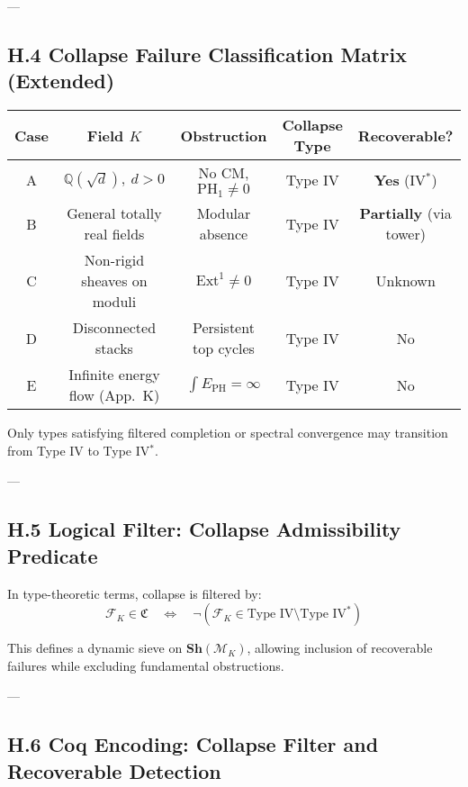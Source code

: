 \documentclass[11pt]{article}
\begin{document}
---

\subsection*{H.4 Collapse Failure Classification Matrix (Extended)}

\begin{center}
\renewcommand{\arraystretch}{1.3}
\begin{tabular}{|c|c|c|c|c|}
\hline
\textbf{Case} & \textbf{Field \( K \)} & \textbf{Obstruction} & \textbf{Collapse Type} & \textbf{Recoverable?} \\
\hline
A & \( \mathbb{Q}(\sqrt{d}),\ d > 0 \) & No CM, \( \mathrm{PH}_1 \ne 0 \) & Type IV & \textbf{Yes} (IV$^\ast$) \\
B & General totally real fields & Modular absence & Type IV & \textbf{Partially} (via tower) \\
C & Non-rigid sheaves on moduli & \( \mathrm{Ext}^1 \ne 0 \) & Type IV & Unknown \\
D & Disconnected stacks & Persistent top cycles & Type IV & No \\
E & Infinite energy flow (App.~K) & \( \int E_{\mathrm{PH}} = \infty \) & Type IV & No \\
\hline
\end{tabular}
\end{center}

Only types satisfying filtered completion or spectral convergence may transition from Type IV to Type IV$^{\ast}$.

---

\subsection*{H.5 Logical Filter: Collapse Admissibility Predicate}

In type-theoretic terms, collapse is filtered by:
\[
\mathcal{F}_K \in \mathfrak{C} \quad \Leftrightarrow \quad \neg (\mathcal{F}_K \in \text{Type IV} \setminus \text{Type IV}^{\ast})
\]

This defines a dynamic sieve on \( \mathbf{Sh}(\mathcal{M}_K) \), allowing inclusion of recoverable failures while excluding fundamental obstructions.

---

\subsection*{H.6 Coq Encoding: Collapse Filter and Recoverable Detection}
\label{subsec:coq-typeiv}
\end{document}
